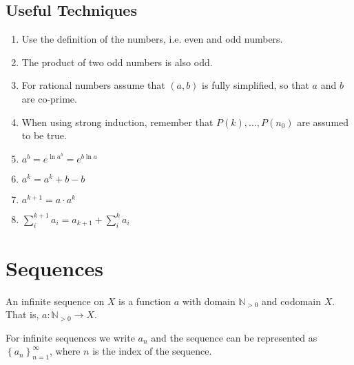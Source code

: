\documentclass{article}
\newcommand*{\N}{\mathbb{N}}
\theoremstyle{plain}
\numberwithin{theorem}{subsection}
\theoremstyle{definition}
\numberwithin{definition}{subsection}
\theoremstyle{remark}
\numberwithin{note}{subsection}
\begin{document}
\subsection{Useful Techniques}
\nopagebreak
\begin{multicols}{2}
    \begin{enumerate}
        \item Use the definition of the numbers, i.e. even and odd numbers.
        \item The product of two odd numbers is also odd.
        \item For rational numbers assume that $(a,b)$ is fully simplified, so that $a$ and $b$ are co-prime.
        \item When using strong induction, remember that $P(k), \ldots, P(n_0)$ are assumed to be true.
              \columnbreak
        \item $a^b=e^{\ln{a^b}}=e^{b\ln{a}}$
        \item $a^k = a^k + b - b$
        \item $a^{k+1} = a \cdot a^k$
        \item $\sum_{i}^{k+1} a_i = a_{k+1} + \sum_{i}^{k} a_i$
    \end{enumerate}
\end{multicols}
%
\section{Sequences}
An infinite sequence on $X$ is a function $a$ with domain $\N_{> 0}$ and codomain $X$. That is, $a:\N_{> 0}\to X$.

For infinite sequences we write $a_n$ and the sequence can be represented as $\left\{a_n\right\}_{n=1}^\infty$, where $n$ is the index of the sequence.
%
\end{document}
